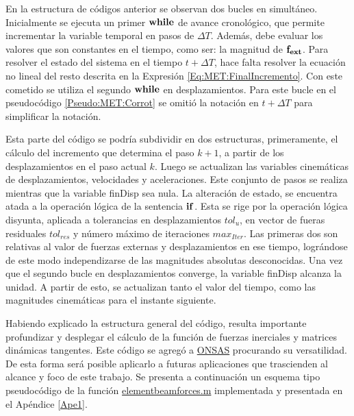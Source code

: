 En la estructura de códigos anterior se observan dos bucles en simultáneo. Inicialmente se ejecuta un primer $\bf{while}$ de avance cronológico, que permite incrementar la variable temporal en pasos de $\Delta T$. Además, debe evaluar los valores que son constantes en el tiempo, como ser: la magnitud de $\bf{f}_{ext}$. Para resolver el estado del sistema en el tiempo $t+\Delta T$, hace falta resolver la ecuación no lineal del resto descrita en la Expresión \eqref{Eq:MET:FinalIncremento}. Con este cometido se utiliza el segundo $\bf{while}$ en desplazamientos. Para este bucle en el pseudocódigo \ref{Pseudo:MET:Corrot} se omitió la notación en $t+\Delta T$ para simplificar la notación.

Esta parte del código se podría subdividir en dos estructuras, primeramente, el cálculo del incremento que determina el paso $k+1$, a partir de los desplazamientos en el paso actual $k$. Luego se actualizan las variables cinemáticas de desplazamientos, velocidades y aceleraciones. Este conjunto de pasos se realiza mientras que la variable finDisp sea nula. La alteración de estado, se encuentra atada a la operación lógica de la sentencia $\bf{if}$. Esta se rige por la operación lógica disyunta, aplicada a tolerancias en desplazamientos $tol_u$, en vector de fueras residuales $tol_{res}$ y número máximo de iteraciones $max_{Iter}$. Las primeras dos son relativas al valor de fuerzas externas y desplazamientos en ese tiempo, lográndose de este modo independizarse de las magnitudes absolutas desconocidas. Una vez que el segundo bucle en desplazamientos converge, la variable finDisp alcanza la unidad. A partir de esto, se actualizan tanto el valor del tiempo, como las magnitudes cinemáticas para el instante siguiente.

Habiendo explicado la estructura general del código, resulta importante profundizar y desplegar el cálculo de la función de fuerzas inerciales y matrices dinámicas tangentes. Este código se agregó a \href{https://github.com/ONSAS/ONSAS.m/}{ONSAS} procurando su versatilidad. De esta forma será posible aplicarlo a futuras aplicaciones que trascienden al alcance y foco de este trabajo. Se presenta a continuación un esquema tipo pseudocódigo de la función \href{https://github.com/ONSAS/ONSAS/blob/master/src/elementBeamForces.m}{elementbeamforces.m} implementada y presentada en el Apéndice \ref{Ape1}. 


